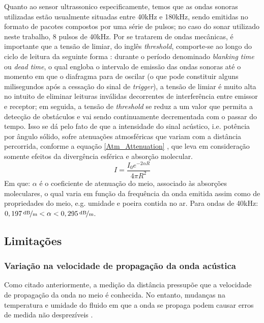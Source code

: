 Quanto ao sensor ultrassonico especificamente, temos que as ondas sonoras utilizadas estão usualmente situadas entre 40kHz e 180kHz, sendo 
emitidas no formato de pacotes compostos por uma série de pulsos; no caso do sonar utilizado neste trabalho, 8 pulsos de 40kHz. 
Por se tratarem de ondas mecânicas, é importante que a tensão de limiar, do inglês \textit{threshold}, comporte-se ao longo do ciclo de 
leitura da seguinte forma \cite{siegwart}: 
durante o período denominado \textit{blanking time}\cite{siegwart}  ou \textit{dead time}\cite{murphy}, o qual engloba o intervalo de 
emissão das ondas sonoras até o momento em que o diafragma para de oscilar (o que pode constituir alguns milisegundos após a cessação do sinal de 
\textit{trigger}), a tensão de limiar é muito alta no intuito de eliminar leituras inválidas decorrentes de interferência entre emissor e receptor; em 
seguida, a tensão de \textit{threshold} se reduz a um valor que permita a detecção de obstáculos e vai sendo continuamente decrementada com o passar 
do tempo. 
Isso se dá pelo fato de que a intensidade do sinal acústico, i.e. potência por ângulo sólido, sofre atenuações atmosféricas que variam com a 
distância percorrida, conforme a equação \ref{Atm_Attenuation} \cite{everett}, que leva em consideração somente efeitos da divergência esférica e 
absorção molecular.
\begin{equation}
 \label{Atm_Attenuation}
 I = \frac{ I_0 e^{-2 \alpha R} }{4 \pi R^2}
\end{equation}
Em que: $\alpha$ é o coeficiente de atenuação do meio, associado às absorções moleculares, o qual varia em função da frequência da onda emitida 
assim como de propriedades do meio, e.g. umidade e poeira contida no ar.
Para ondas de 40kHz: $\unitfrac[0,197]{dB}{m} < \alpha <  \unitfrac[0,295]{dB}{m}$. %

\subsection{Limitações}

\subsubsection{Variação na velocidade de propagação da onda acústica}
Como citado anteriormente, a medição da distância pressupõe que a velocidade de propagação da onda no meio é conhecida. 
No entanto, mudanças na temperatura e umidade do fluido em que a onda se propaga podem causar erros de medida não desprezíveis \cite{everett}.

